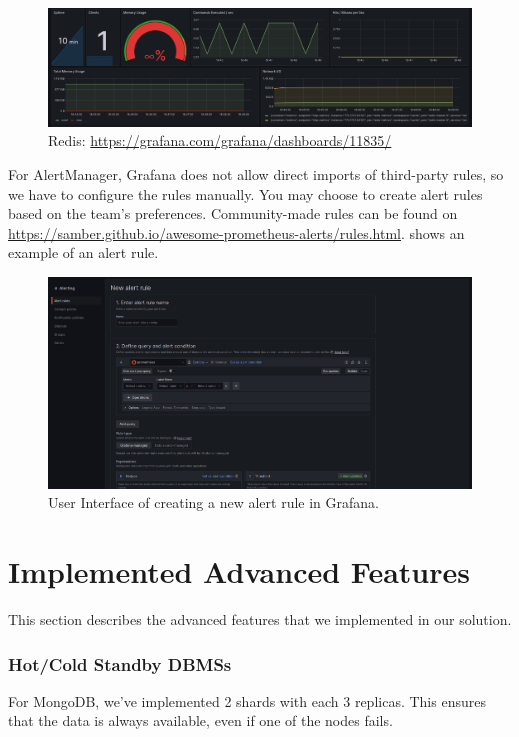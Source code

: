 \documentclass{report}
\begin{document}
    \begin{figure}[H]
        \centering
        \includegraphics[width=\textwidth]{images/dashboard-redis}
        \caption{Redis: \url{https://grafana.com/grafana/dashboards/11835/}}
        \label{fig:dashboard-redis}
    \end{figure}

    For AlertManager, Grafana does not allow direct imports of third-party rules, so we have to configure the rules manually. You may choose to create alert rules based on the team's preferences. Community-made rules can be found on \url{https://samber.github.io/awesome-prometheus-alerts/rules.html}.  shows an example of an alert rule.

    \begin{figure}[H]
        \centering
        \includegraphics[width=\textwidth]{images/alerting-create}
        \caption{User Interface of creating a new alert rule in Grafana.}
        \label{fig:alerting-create}
    \end{figure}

    \section{Implemented Advanced Features}\label{sec:advanced-requirements}
    This section describes the advanced features that we implemented in our solution.
    \subsubsection{Hot/Cold Standby DBMSs}
    For MongoDB, we've implemented 2 shards with each 3 replicas. This ensures that the data is always available, even if one of the nodes fails.
\end{document}
